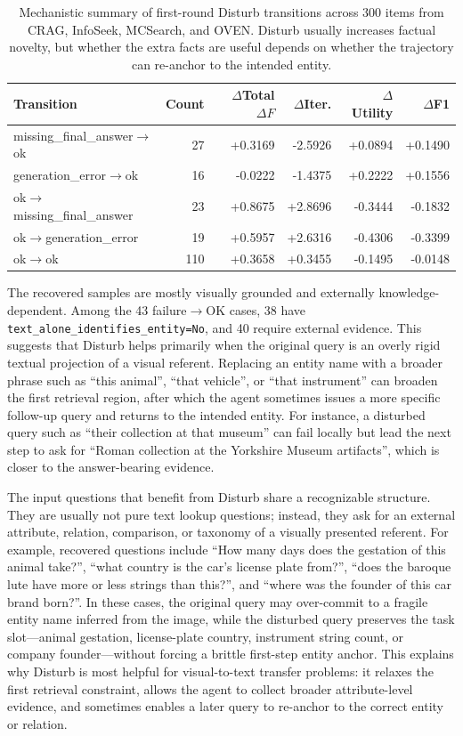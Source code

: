 \documentclass{article}
\begin{document}
\begin{table}[t]
\centering
\small
\setlength{\tabcolsep}{5pt}
\begin{tabular}{lrrrrr}
\hline
Transition & Count & $\Delta$Total $\Delta F$ & $\Delta$Iter. & $\Delta$Utility & $\Delta$F1 \\
\hline
missing\_final\_answer$\rightarrow$ok & 27 & +0.3169 & -2.5926 & +0.0894 & +0.1490 \\
generation\_error$\rightarrow$ok & 16 & -0.0222 & -1.4375 & +0.2222 & +0.1556 \\
ok$\rightarrow$missing\_final\_answer & 23 & +0.8675 & +2.8696 & -0.3444 & -0.1832 \\
ok$\rightarrow$generation\_error & 19 & +0.5957 & +2.6316 & -0.4306 & -0.3399 \\
ok$\rightarrow$ok & 110 & +0.3658 & +0.3455 & -0.1495 & -0.0148 \\
\hline
\end{tabular}
\caption{Mechanistic summary of first-round Disturb transitions across 300 items from CRAG, InfoSeek, MCSearch, and OVEN. Disturb usually increases factual novelty, but whether the extra facts are useful depends on whether the trajectory can re-anchor to the intended entity.}
\label{tab:disturb-mechanism-transition}
\end{table}

The recovered samples are mostly visually grounded and externally knowledge-dependent.
Among the 43 failure$\rightarrow$OK cases, 38 have \texttt{text\_alone\_identifies\_entity=No}, and 40 require external evidence.
This suggests that Disturb helps primarily when the original query is an overly rigid textual projection of a visual referent.
Replacing an entity name with a broader phrase such as ``this animal'', ``that vehicle'', or ``that instrument'' can broaden the first retrieval region, after which the agent sometimes issues a more specific follow-up query and returns to the intended entity.
For instance, a disturbed query such as ``their collection at that museum'' can fail locally but lead the next step to ask for ``Roman collection at the Yorkshire Museum artifacts'', which is closer to the answer-bearing evidence.

The input questions that benefit from Disturb share a recognizable structure.
They are usually not pure text lookup questions; instead, they ask for an external attribute, relation, comparison, or taxonomy of a visually presented referent.
For example, recovered questions include ``How many days does the gestation of this animal take?'', ``what country is the car's license plate from?'', ``does the baroque lute have more or less strings than this?'', and ``where was the founder of this car brand born?''.
In these cases, the original query may over-commit to a fragile entity name inferred from the image, while the disturbed query preserves the task slot---animal gestation, license-plate country, instrument string count, or company founder---without forcing a brittle first-step entity anchor.
This explains why Disturb is most helpful for visual-to-text transfer problems: it relaxes the first retrieval constraint, allows the agent to collect broader attribute-level evidence, and sometimes enables a later query to re-anchor to the correct entity or relation.
\end{document}

